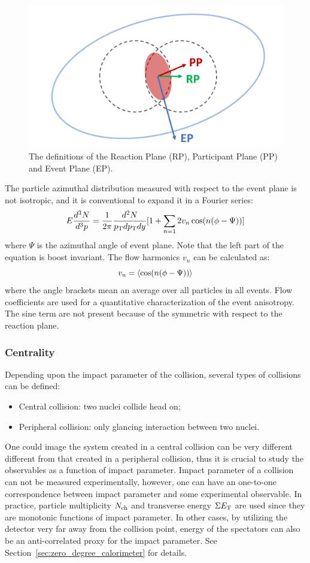 \begin{figure}[H]
\centering
\includegraphics[width=.7\linewidth]{figs/chapter_intro/HI_geometry}
\caption{The definitions of the Reaction Plane (RP), Participant Plane (PP) and Event Plane (EP).}
\label{fig:intro_HI_geometry}
\end{figure}

The particle azimuthal distribution measured with respect to the event plane is not isotropic, and it is conventional to expand it in a Fourier series:
\begin{equation}
E \frac{d^3 N}{d^3 p} = \frac{1}{2\pi} \frac{d^2 N}{p_\text{T} dp_\text{T} dy}[1+\sum_{n=1} 2 v_n \cos (n(\phi-\Psi))]
\end{equation}
where $\Psi$ is the azimuthal angle of event plane. Note that the left part of the equation is boost invariant. The flow harmonics $v_n$ can be calculated as:
\begin{equation}
v_n = \left\langle \cos (n(\phi - \Psi))\right\rangle
\end{equation}
where the angle brackets mean an average over all particles in all events. Flow coefficients are used for a quantitative characterization of the event anisotropy. The sine term are not present because of the symmetric with respect to the reaction plane.



\subsubsection{Centrality}

Depending upon the impact parameter of the collision, several types of collisions can be defined:
\begin{itemize}
\item Central collision: two nuclei collide head on;
\item Peripheral collision: only glancing interaction between two nuclei.
\end{itemize}
One could image the system created in a central collision can be very different different from that created in a peripheral collision, thus it is crucial to study the observables as a function of impact parameter. Impact parameter of a collision can not be measured experimentally, however, one can have an one-to-one correspondence between impact parameter and some experimental observable. In practice, particle multiplicity $N_\text{ch}$ and transverse energy $\Sigma E_\text{T}$ are used since they are monotonic functions of impact parameter. In other cases, by utilizing the detector very far away from the collision point, energy of the spectators can also be an anti-correlated proxy for the impact parameter. See Section~\ref{sec:zero_degree_calorimeter} for details.


